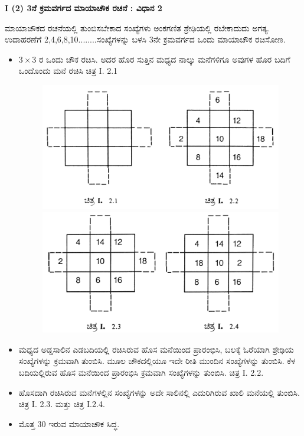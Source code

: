 \noindent \textbf{I (2) 3ನೆ ಕ್ರಮವರ್ಗದ ಮಾಯಾಚೌಕ ರಚನೆ : ವಿಧಾನ 2}

ಮಾಯಾಚೌಕದ ರಚನೆಯಲ್ಲಿ ತುಂಬಿಸಬೇಕಾದ ಸಂಖ್ಯೆಗಳು ಅಂಕಗಣಿತ ಶ್ರೇಢಿಯಲ್ಲಿ ರಬೇಕಾದುದು ಅಗತ್ಯ. ಉದಾಹರಣೆಗೆ 2,4,6,8,10........ಸಂಖ್ಯೆಗಳನ್ನು ಬಳಸಿ 3ನೇ \linebreak ಕ್ರಮವರ್ಗದ ಒಂದು ಮಾಯಾಚೌಕ ರಚಿಸೋಣ.

\begin{itemize}
	\item $3 \times 3$ ರ ಒಂದು ಚೌಕ ರಚಿಸಿ. ಅದರ ಹೊರ ಸುತ್ತಿನ ಮಧ್ಯದ ನಾಲ್ಕು ಮನೆಗಳಿಗೂ ಅವುಗಳ ಹೊರ ಬದಿಗೆ ಒಂದೊಂದು ಮನೆ ರಚಿಸಿ ಚಿತ್ರ I. 2.1
	\begin{figure}[H]
	\includegraphics{src/figures/chap3/fig3-3.jpg}\\
	\includegraphics{src/figures/chap3/fig3-4.jpg}
	\end{figure}
	\item ಮಧ್ಯದ ಅಡ್ಡಸಾಲಿನ ಎಡಬದಿಯಲ್ಲಿ ರಚಿಸಿರುವ ಹೊಸ ಮನೆಯಿಂದ ಪ್ರಾರಂಭಿಸಿ, ಬಲಕ್ಕೆ ಓರೆಯಾಗಿ ಶ್ರೇಢಿಯ ಸಂಖ್ಯೆಗಳನ್ನು ಕ್ರಮವಾಗಿ ತುಂಬಿಸಿ. ಮೂಲ ಚೌಕದಲ್ಲಿಯೂ ಇದೇ ರೀತಿ ಮುಂದಿನ ಸಂಖ್ಯೆಗಳನ್ನು ತುಂಬಿಸಿ. ಕೆಳ ಬದಿಯಲ್ಲಿರುವ ಹೊಸ ಮನೆಯಿಂದ ಪ್ರಾರಂಭಿಸಿ ಕ್ರಮವಾಗಿ ಸಂಖ್ಯೆಗಳನ್ನು ತುಂಬಿಸಿ. ಚಿತ್ರ I. 2.2.
	\item ಹೊಸದಾಗಿ ರಚಿಸಿರುವ ಮನೆಗಳಲ್ಲಿನ ಸಂಖ್ಯೆಗಳನ್ನು ಅದೇ ಸಾಲಿನಲ್ಲಿ ಎದುರಿಗಿರುವ ಖಾಲಿ ಮನೆಯಲ್ಲಿ ತುಂಬಿಸಿ. ಚಿತ್ರ I. 2.3. ಮತ್ತು ಚಿತ್ರ I.2.4.
	\item ಮೊತ್ತ 30 ಇರುವ ಮಾಯಾಚೌಕ ಸಿದ್ಧ.
\end{itemize}

